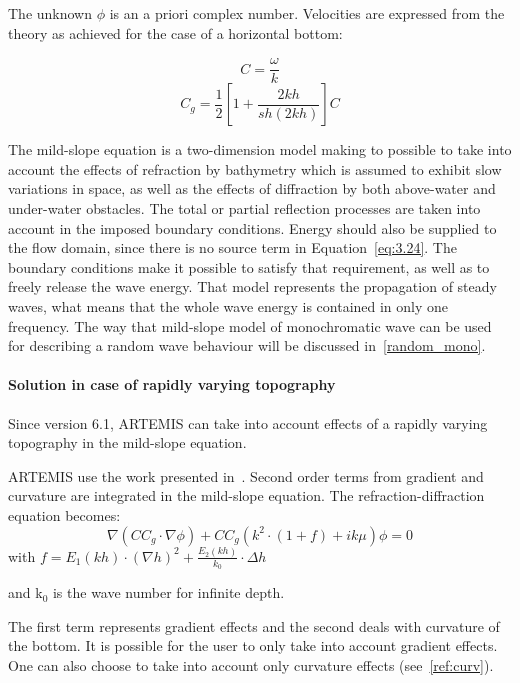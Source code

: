 The unknown $\phi$ is an a priori complex number. Velocities are expressed from
the theory as achieved for the case of a horizontal bottom:

\begin{equation}
  C = \frac{\omega}{k}
  \label{eq:3.25}
\end{equation}
\begin{equation}
  C_{g} = \frac{1}{2}\left[1+\frac{2kh}{sh(2kh)}\right]C
  \label{eq:3.26}
\end{equation}

The mild-slope equation is a two-dimension model making to possible to take
into account the effects of refraction by bathymetry which is assumed to
exhibit slow variations in space, as well as the effects of diffraction by both
above-water and under-water obstacles. The total or partial reflection
processes are taken into account in the imposed boundary conditions. Energy
should also be supplied to the flow domain, since there is no source term in
Equation~\eqref{eq:3.24}. The boundary conditions make it possible to
satisfy that requirement, as well as to freely release the wave energy. That
model represents the propagation of steady waves, what means that the whole
wave energy is contained in only one frequency. The way that mild-slope model
of monochromatic wave can be used for describing a random wave behaviour will
be discussed in~\ref{random_mono}.


\paragraph{Solution in case of rapidly varying topography}

Since version 6.1, ARTEMIS can take into account effects of a rapidly varying
topography in the mild-slope equation.

ARTEMIS use the work presented in~\cite{Michel1999}. Second order terms from
gradient and curvature are integrated in the mild-slope equation. The
refraction-diffraction equation becomes:
\[\nabla \left(CC_{g} \cdot \nabla \phi \right)+CC_{g} \left(k^{2} \cdot \left(1+f\right)+ik\mu \right)\phi =0\]
with $f=E_{1} (kh)\cdot \left(\nabla h\right)^{2} +\frac{E_{2} (kh)}{k_{0} } \cdot \Delta h$

and k${}_{0}$ is the wave number for infinite depth.

The first term represents gradient effects and the second deals with curvature
of the bottom. It is possible for the user to only take into account gradient
effects. One can also choose to take into account only curvature effects
(see~\ref{ref:curv}).

